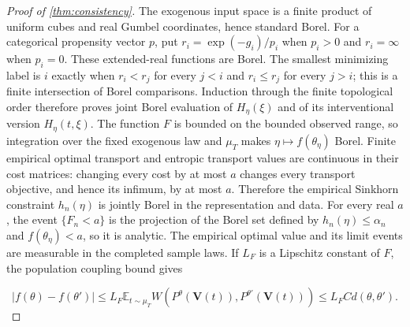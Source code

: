 \begin{proof}[Proof of \cref{thm:consistency}]
The exogenous input space is a finite product of uniform cubes and real Gumbel coordinates, hence standard Borel. For a categorical propensity vector $p$, put $r_i=\exp(-g_i)/p_i$ when $p_i>0$ and $r_i=\infty$ when $p_i=0$. These extended-real functions are Borel. The smallest minimizing label is $i$ exactly when $r_i<r_j$ for every $j<i$ and $r_i\leqslant r_j$ for every $j>i$; this is a finite intersection of Borel comparisons. Induction through the finite topological order therefore proves joint Borel evaluation of $H_\eta(\xi)$ and of its interventional version $H_\eta(t,\xi)$. The function $F$ is bounded on the bounded observed range, so integration over the fixed exogenous law and $\mu_T$ makes $\eta\mapsto f(\theta_\eta)$ Borel. Finite empirical optimal transport and entropic transport values are continuous in their cost matrices: changing every cost by at most $a$ changes every transport objective, and hence its infimum, by at most $a$. Therefore the empirical Sinkhorn constraint $h_n(\eta)$ is jointly Borel in the representation and data. For every real $a$, the event $\{F_n<a\}$ is the projection of the Borel set defined by $h_n(\eta)\leqslant\alpha_n$ and $f(\theta_\eta)<a$, so it is analytic. The empirical optimal value and its limit events are measurable in the completed sample laws. If $L_F$ is a Lipschitz constant of $F$, the population coupling bound gives

\[
|f(\theta)-f(\theta')|\leqslant L_F\mathbb E_{t\sim\mu_T}W(P^\theta(\boldsymbol V(t)),P^{\theta'}(\boldsymbol V(t)))\leqslant L_F C d(\theta,\theta').
\]


\end{proof}
